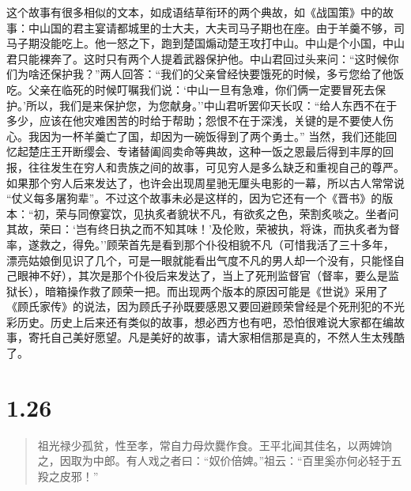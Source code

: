 \documentclass[]{book}
\begin{document}
这个故事有很多相似的文本，如成语结草衔环的两个典故，如《战国策》中的故事：中山国的君主宴请都城里的士大夫，大夫司马子期也在座。由于羊羹不够，司马子期没能吃上。他一怒之下，跑到楚国煽动楚王攻打中山。中山是个小国，中山君只能裸奔了。这时只有两个人提着武器保护他。中山君回过头来问：``这时候你们为啥还保护我？''两人回答：``我们的父亲曾经快要饿死的时候，多亏您给了他饭吃。父亲在临死的时候叮嘱我们说：`中山一旦有急难，你们俩一定要冒死去保护。'所以，我们是来保护您，为您献身。''中山君听罢仰天长叹：``给人东西不在于多少，应该在他灾难困苦的时给于帮助；怨恨不在于深浅，关键的是不要使人伤心。我因为一杯羊羹亡了国，却因为一碗饭得到了两个勇士。''
当然，我们还能回忆起楚庄王开断缨会、专诸替阖闾卖命等典故，这种一饭之恩最后得到丰厚的回报，往往发生在穷人和贵族之间的故事，可见穷人是多么缺乏和重视自己的尊严。如果那个穷人后来发达了，也许会出现周星驰无厘头电影的一幕，所以古人常常说
``仗义每多屠狗辈''。不过这个故事未必是这样的，因为它还有一个《晋书》的版本：``初，荣与同僚宴饮，见执炙者貌状不凡，有欲炙之色，荣割炙啖之。坐者问其故，荣曰：`岂有终日执之而不知其味！'及伦败，荣被执，将诛，而执炙者为督率，遂救之，得免。''顾荣首先是看到那个仆役相貌不凡（可惜我活了三十多年，漂亮姑娘倒见识了几个，可是一眼就能看出气度不凡的男人却一个没有，只能怪自己眼神不好），其次是那个仆役后来发达了，当上了死刑监督官（督率，要么是监狱长），暗箱操作救了顾荣一把。而出现两个版本的原因可能是《世说》采用了《顾氏家传》的说法，因为顾氏子孙既要感恩又要回避顾荣曾经是个死刑犯的不光彩历史。历史上后来还有类似的故事，想必西方也有吧，恐怕很难说大家都在编故事，寄托自己美好愿望。凡是美好的故事，请大家相信那是真的，不然人生太残酷了。

\section{1.26}\label{section-25}

\begin{quote}
祖光禄少孤贫，性至孝，常自力母炊爨作食。王平北闻其佳名，以两婢饷之，因取为中郎。有人戏之者曰：``奴价倍婢。''祖云：``百里奚亦何必轻于五羖之皮邪！''
\end{quote}
\end{document}
